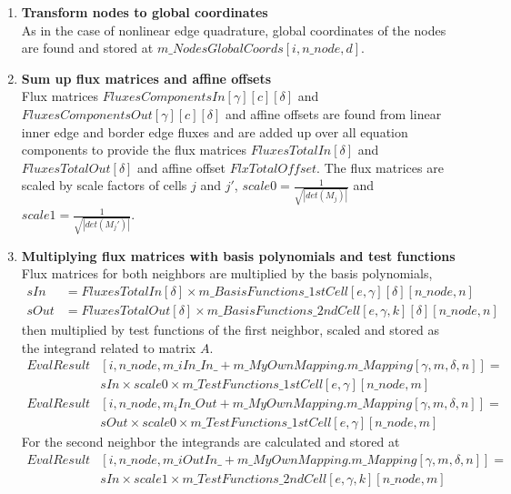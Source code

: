 \documentclass[BoSSSForSolvingConservationLaws.tex]{subfiles}
\begin{document}
\begin{itemize}
\begin{enumerate}
\item \textbf{Transform nodes to global coordinates}\\
As in the case of nonlinear edge quadrature, global coordinates of the nodes are found and stored at $m\_NodesGlobalCoords[i,n\_node,d]$.
\item \textbf{Sum up flux matrices and affine offsets}\\
\label{StartOfLoopEdge}
Flux matrices $FluxesComponentsIn[\gamma][c][\delta]$ and $FluxesComponentsOut[\gamma][c][\delta]$ and affine offsets are found from linear inner edge and border edge fluxes and are added up over all equation components to provide the flux matrices $FluxesTotalIn[\delta]$ and $FluxesTotalOut[\delta]$ and affine offset $FlxTotalOffset$. The flux matrices are scaled by scale factors of cells $j$ and $j'$, $scale0=\frac{1}{\sqrt{|det(M_j)|}}$ and $scale1=\frac{1}{\sqrt{|det(M_j')|}}$.
\item \textbf{Multiplying flux matrices with basis polynomials and test functions}\\
Flux matrices for both neighbors are multiplied by the basis polynomials,
\begin{align*}
sIn &= FluxesTotalIn[\delta] \times m\_BasisFunctions\_1stCell[e, \gamma][\delta][n\_node,n]\\
sOut &= FluxesTotalOut[\delta] \times m\_BasisFunctions\_2ndCell[e, \gamma, k][\delta][n\_node,n]
\end{align*}
then multiplied by test functions of the first neighbor, scaled and stored as the integrand related to matrix $A$.
\begin{align*}
EvalResult&[i, n\_node, m\_iIn\_In\_ + m\_MyOwnMapping.m\_Mapping[\gamma, m, \delta, n]] =\\ &sIn\times scale0 \times m\_TestFunctions\_1stCell[e, \gamma][n\_node,m]\\
EvalResult&[i, n\_node, m_iIn\_Out + m\_MyOwnMapping.m\_Mapping[\gamma, m, \delta, n]] =\\ &sOut \times scale0 \times m\_TestFunctions\_1stCell[e, \gamma][n\_node,m]
\end{align*}
For the second neighbor the integrands are calculated and stored at
\begin{align*}
EvalResult&[i, n\_node, m\_iOutIn\_ + m\_MyOwnMapping.m\_Mapping[\gamma, m, \delta, n]] =\\ &sIn \times scale1 \times m\_TestFunctions\_2ndCell[e, \gamma, k][n\_node,m]\\

\end{align*}
\end{enumerate}
\end{itemize}
\end{document}
